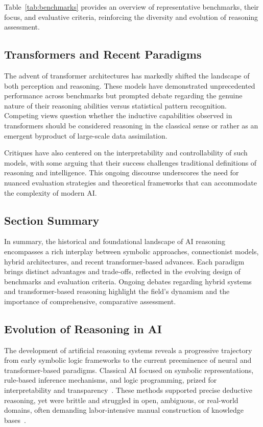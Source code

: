 \documentclass[sigconf]{acmart}
\begin{document}
Table~\ref{tab:benchmarks} provides an overview of representative benchmarks, their focus, and evaluative criteria, reinforcing the diversity and evolution of reasoning assessment.

\subsection{Transformers and Recent Paradigms}
The advent of transformer architectures has markedly shifted the landscape of both perception and reasoning. These models have demonstrated unprecedented performance across benchmarks but prompted debate regarding the genuine nature of their reasoning abilities versus statistical pattern recognition. Competing views question whether the inductive capabilities observed in transformers should be considered reasoning in the classical sense or rather as an emergent byproduct of large-scale data assimilation.

Critiques have also centered on the interpretability and controllability of such models, with some arguing that their success challenges traditional definitions of reasoning and intelligence. This ongoing discourse underscores the need for nuanced evaluation strategies and theoretical frameworks that can accommodate the complexity of modern AI.

\subsection{Section Summary}
In summary, the historical and foundational landscape of AI reasoning encompasses a rich interplay between symbolic approaches, connectionist models, hybrid architectures, and recent transformer-based advances. Each paradigm brings distinct advantages and trade-offs, reflected in the evolving design of benchmarks and evaluation criteria. Ongoing debates regarding hybrid systems and transformer-based reasoning highlight the field's dynamism and the importance of comprehensive, comparative assessment.

\subsection{Evolution of Reasoning in AI}

The development of artificial reasoning systems reveals a progressive trajectory from early symbolic logic frameworks to the current preeminence of neural and transformer-based paradigms. Classical AI focused on symbolic representations, rule-based inference mechanisms, and logic programming, prized for interpretability and transparency~\cite{ref42,ref49,ref54,ref86}. These methods supported precise deductive reasoning, yet were brittle and struggled in open, ambiguous, or real-world domains, often demanding labor-intensive manual construction of knowledge bases~\cite{ref86}.
\end{document}
